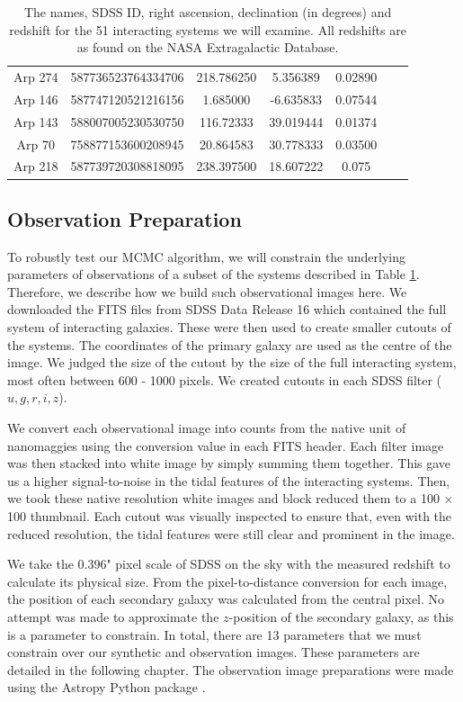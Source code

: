 \begin{table}
{\begin{tabular}{|c|c|c|c|c|c|c|}
Arp 274 & 587736523764334706 & 218.786250 & 5.356389 & 0.02890 \\
Arp 146 & 587747120521216156 & 1.685000 & -6.635833 & 0.07544 \\
Arp 143 & 588007005230530750 & 116.72333 & 39.019444 & 0.01374 \\
Arp 70 & 758877153600208945 & 20.864583 & 30.778333 & 0.03500 \\
Arp 218 & 587739720308818095 & 238.397500 & 18.607222 & 0.075 \\
\hline
\end{tabular}}
\caption[The names, SDSS ID, right ascension, declination (in degrees) and redshift for the 51 interacting systems we will examine.]{The names, SDSS ID, right ascension, declination (in degrees) and redshift for the 51 interacting systems we will examine. All redshifts are as found on the NASA Extragalactic Database.}
\label{tab:Objects}
\end{table}

\subsection{Observation Preparation}\label{data:obs-prep}
\noindent To robustly test our MCMC algorithm, we will constrain the underlying parameters of observations of a subset of the systems described in Table \ref{tab:Objects}. Therefore, we describe how we build such observational images here. We downloaded the FITS files from SDSS Data Release 16 which contained the full system of interacting galaxies. These were then used to create smaller cutouts of the systems. The coordinates of the primary galaxy are used as the centre of the image. We judged the size of the cutout by the size of the full interacting system, most often between 600 - 1000 pixels. We created cutouts in each SDSS filter ($u, g, r, i, z$).

We convert each observational image into counts from the native unit of nanomaggies using the conversion value in each FITS header. Each filter image was then stacked into white image by simply summing them together. This gave us a higher signal-to-noise in the tidal features of the interacting systems. Then, we took these native resolution white images and block reduced them to a 100 $\times$ 100 thumbnail. Each cutout was visually inspected to ensure that, even with the reduced resolution, the tidal features were still clear and prominent in the image.

We take the 0.396" pixel scale of SDSS on the sky with the measured redshift to calculate its physical size. From the pixel-to-distance conversion for each image, the position of each secondary galaxy was calculated from the central pixel. No attempt was made to approximate the $z$-position of the secondary galaxy, as this is a parameter to constrain. In total, there are 13 parameters that we must constrain over our synthetic and observation images. These parameters are detailed in the following chapter. The observation image preparations were made using the Astropy Python package \citep{astropy_2013, astropy_2018}.

